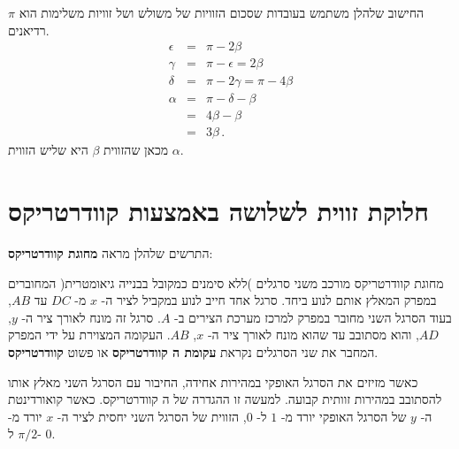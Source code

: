 \documentclass[12pt,a4paper]{article}
\newcommand*{\qd}{קוודרטריקס}
\begin{document}
החישוב שלהלן משתמש בעובדות שסכום הזוויות של משולש ושל זוויות משלימות הוא
$\pi$
רדיאנים.
\begin{eqnarray*}
\epsilon &=& \pi - 2\beta\\
\gamma &=& \pi - \epsilon = 2\beta\\
\delta &=& \pi - 2\gamma = \pi - 4\beta\\
\alpha &=& \pi - \delta - \beta\\
&=& 4\beta -\beta\\
&=& 3\beta\,.
\end{eqnarray*}
מכאן שהזווית
$\beta$
היא שליש הזווית
$\alpha$.

\section{חלוקת זווית לשלושה באמצעות
\qd{}%
}\label{s.q}

התרשים שלהלן מראה
\textbf{מחוגת \qd{}}:
\begin{center}
\end{center}

מחוגת
\qd{}
מורכב משני סרגלים )ללא סימנים כמקובל בבנייה גיאומטרית( המחוברים במפרק המאלץ אותם לנוע ביחד. סרגל אחד חייב לנוע במקביל לציר ה-%
$x$
מ-%
$DC$
עד
$AB$,
בעוד הסרגל השני מחובר במפרק למרכז מערכת הצירים ב-%
$A$.
סרגל זה מונח לאורך ציר ה-%
$y$, $AD$,
והוא מסתובב עד שהוא מונח לאורך ציר ה-%
$x$, $AB$.
העקומה המצוירת על ידי המפרק המחבר את שני הסרגלים נקראת
\textbf{עקומת ה%
\qd{}%
}
או פשוט
\textbf{\qd{}}.

כאשר מזיזים את הסרגל האופקי במהירות אחידה, החיבור עם הסרגל השני מאלץ אותו להסתובב במהירות זוותית קבועה. למעשה זו ההגדרה של ה%
\qd{}.
כאשר קואורדינטת ה-%
$y$
של הסרגל האופקי יורד מ-%
$1$
ל-%
$0$,
הזווית של הסרגל השני יחסית לציר ה-%
$x$
יורד מ-%
$\pi/2$
ל-%
$0$.
\end{document}
